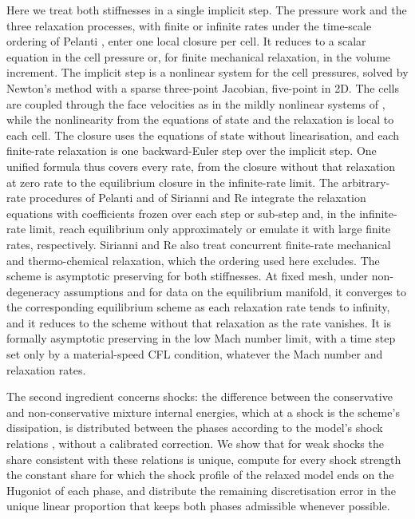 \documentclass[a4paper,fleqn]{cas-sc}
\begin{document}
Here we treat both stiffnesses in a single implicit step. The pressure work and the three relaxation processes, with
finite or infinite rates under the time-scale ordering of Pelanti \cite{Pelanti2022}, enter one local closure per cell.
It reduces to a scalar equation in the cell pressure or, for finite mechanical relaxation, in the volume increment. The
implicit step is a nonlinear system for the cell pressures, solved by Newton's method with a sparse three-point
Jacobian, five-point in 2D. The cells are coupled through the face velocities as in the mildly nonlinear systems of
\cite{DumbserCasulli2016,CasulliZanolli2012}, while the nonlinearity from the equations of state and the relaxation is
local to each cell. The closure uses the equations of state without linearisation, and each finite-rate relaxation is
one backward-Euler step over the implicit step. One unified formula thus covers every rate, from the closure without
that relaxation at zero rate to the equilibrium closure in the infinite-rate limit. The arbitrary-rate procedures of
Pelanti \cite{Pelanti2022} and of Sirianni and Re \cite{SirianniRe2026} integrate the relaxation equations with
coefficients frozen over each step or sub-step and, in the infinite-rate limit, reach equilibrium only approximately or
emulate it with large finite rates, respectively. Sirianni and Re also treat concurrent finite-rate mechanical and
thermo-chemical relaxation, which the ordering used here excludes. The scheme is asymptotic preserving for both
stiffnesses. At fixed mesh, under non-degeneracy assumptions and for data on the equilibrium manifold, it converges to
the corresponding equilibrium scheme as each relaxation rate tends to infinity, and it reduces to the scheme without
that relaxation as the rate vanishes. It is formally asymptotic preserving in the low Mach number limit, with a time
step set only by a material-speed CFL condition, whatever the Mach number and relaxation rates.

The second ingredient concerns shocks: the difference between the conservative and non-conservative mixture internal
energies, which at a shock is the scheme's dissipation, is distributed between the phases according to the model's shock
relations \cite{SaurelGavrilyukRenaud2003}, without a calibrated correction. We show that for weak shocks the share
consistent with these relations is unique, compute for every shock strength the constant share for which the shock
profile of the relaxed model ends on the Hugoniot of each phase, and distribute the remaining discretisation error in
the unique linear proportion that keeps both phases admissible whenever possible.
\end{document}
